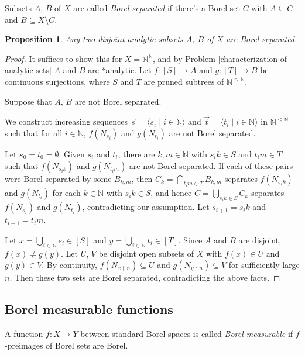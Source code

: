 \documentclass[10pt]{amsart}
\newcommand{\NN}{\mathbb{N}}
\newtheorem{proposition}[theorem]{Proposition}
\theoremstyle{definition}
\theoremstyle{remark}
\begin{document}
Subsets $A$, $B$ of $X$ are called \emph{Borel separated} if there's a Borel set $C$ with $A\subseteq C$ and $B\subseteq X\setminus C$. 

\begin{proposition} \label{separation of analytic sets} 
Any two disjoint analytic subsets $A$, $B$ of $X$ are Borel separated. 
\end{proposition} 
\begin{proof} 
It suffices to show this for $X=\NN^\NN$, and by Problem \ref{characterization of analytic sets} $A$ and $B$ are *analytic. 
Let $f\colon [S]\rightarrow A$ and $g\colon [T]\rightarrow B$ be continuous surjections, where $S$ and $T$ are pruned subtrees of $\NN^{<\NN}$. 

Suppose that $A$, $B$ are not Borel separated. 

We construct increasing sequences $\vec{s}=\langle s_i\mid i\in\NN\rangle$ and $\vec{t}=\langle t_i\mid i\in\NN\rangle$ in $\NN^{<\NN}$ such that for all $i\in\NN$, $f(N_{s_i})$ and $g(N_{t_i})$ are not Borel separated. 

Let $s_0=t_0=\emptyset$. 
Given $s_i$ and $t_i$, there are $k,m\in \NN$ with $s_i k\in S$ and $t_i m\in T$ such that $f(N_{s_i k})$ and $g(N_{t_i m})$ are not Borel separated. 
If each of these pairs were Borel separated by some $B_{k,m}$, then $C_k=\bigcap_{t_i m\in T} B_{k,m}$ separates $f(N_{s_i k})$ and $g(N_{t_i})$ for each $k\in\NN$ with $s_i k\in S$, and hence $C=\bigcup_{s_i k\in S} C_k$ separates $f(N_{s_i})$ and $g(N_{t_i})$, contradicting our assumption. 
Let $s_{i+1}=s_i k$ and $t_{i+1}= t_i m$. 

Let $x=\bigcup_{i\in\NN} s_i\in [S]$ and $y=\bigcup_{i\in\NN} t_i\in [T]$. 
Since $A$ and $B$ are disjoint, $f(x)\neq g(y)$. 
Let $U$, $V$ be disjoint open subsets of $X$ with $f(x)\in U$ and $g(y)\in V$. 
By continuity, $f(N_{x{\upharpoonright}n})\subseteq U$ and $g(N_{y{\upharpoonright}n})\subseteq V$ for sufficiently large $n$. 
Then these two sets are Borel separated, contradicting the above facts. 
\end{proof} 




\subsection{Borel measurable functions} 

A function $f\colon X\rightarrow Y$ between standard Borel spaces is called \emph{Borel measurable} if $f$-preimages of Borel sets are Borel. 
\end{document}
